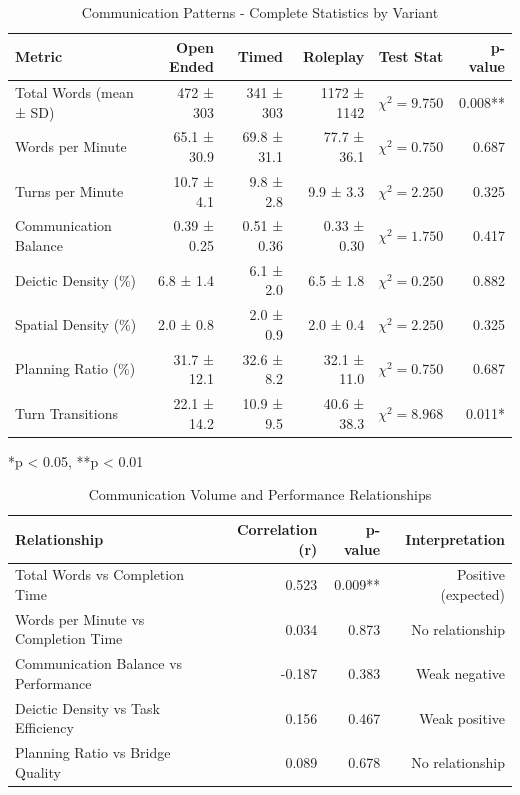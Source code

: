 \begin{table}[H]
\centering
\caption{Communication Patterns - Complete Statistics by Variant}
\label{tab:communication_complete_stats}
\begin{tabular}{lrrrrr}
\toprule
\textbf{Metric} & \textbf{Open Ended} & \textbf{Timed} & \textbf{Roleplay} & \textbf{Test Stat} & \textbf{p-value} \\
\midrule
Total Words (mean ± SD) & 472 ± 303 & 341 ± 303 & 1172 ± 1142 & $\chi^2 = 9.750$ & 0.008** \\
Words per Minute & 65.1 ± 30.9 & 69.8 ± 31.1 & 77.7 ± 36.1 & $\chi^2 = 0.750$ & 0.687 \\
Turns per Minute & 10.7 ± 4.1 & 9.8 ± 2.8 & 9.9 ± 3.3 & $\chi^2 = 2.250$ & 0.325 \\
Communication Balance & 0.39 ± 0.25 & 0.51 ± 0.36 & 0.33 ± 0.30 & $\chi^2 = 1.750$ & 0.417 \\
Deictic Density (\%) & 6.8 ± 1.4 & 6.1 ± 2.0 & 6.5 ± 1.8 & $\chi^2 = 0.250$ & 0.882 \\
Spatial Density (\%) & 2.0 ± 0.8 & 2.0 ± 0.9 & 2.0 ± 0.4 & $\chi^2 = 2.250$ & 0.325 \\
Planning Ratio (\%) & 31.7 ± 12.1 & 32.6 ± 8.2 & 32.1 ± 11.0 & $\chi^2 = 0.750$ & 0.687 \\
Turn Transitions & 22.1 ± 14.2 & 10.9 ± 9.5 & 40.6 ± 38.3 & $\chi^2 = 8.968$ & 0.011* \\
\bottomrule
\end{tabular}
\small
*p < 0.05, **p < 0.01
\end{table}

\begin{table}[H]
\centering
\caption{Communication Volume and Performance Relationships}
\label{tab:communication_performance_complete}
\begin{tabular}{lrrr}
\toprule
\textbf{Relationship} & \textbf{Correlation (r)} & \textbf{p-value} & \textbf{Interpretation} \\
\midrule
Total Words vs Completion Time & 0.523 & 0.009** & Positive (expected) \\
Words per Minute vs Completion Time & 0.034 & 0.873 & No relationship \\
Communication Balance vs Performance & -0.187 & 0.383 & Weak negative \\
Deictic Density vs Task Efficiency & 0.156 & 0.467 & Weak positive \\
Planning Ratio vs Bridge Quality & 0.089 & 0.678 & No relationship \\
\bottomrule
\end{tabular}
\end{table}

